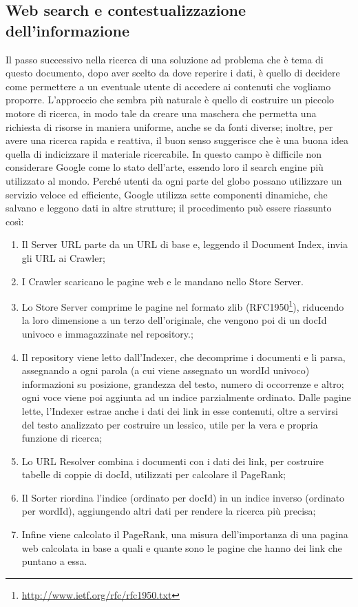 \documentclass[sigproc-sp.tex]{subfiles}
\begin{document}
\subsection{Web search e contestualizzazione dell’informazione} 
Il passo successivo nella ricerca di una soluzione ad problema che è tema di questo documento, dopo aver scelto da dove reperire i dati, è quello di decidere come permettere a un eventuale utente di accedere ai contenuti che vogliamo proporre. L’approccio che sembra più naturale è quello di costruire un piccolo motore di ricerca, in modo tale da creare una maschera che permetta una richiesta di risorse in maniera uniforme, anche se da fonti diverse; inoltre, per avere una ricerca rapida e reattiva, il buon senso suggerisce che è una buona idea quella di indicizzare il materiale ricercabile.
In questo campo è difficile non considerare Google come lo stato dell’arte, essendo loro il search engine più utilizzato al mondo. Perché utenti da ogni parte del globo possano utilizzare un servizio veloce ed efficiente, Google utilizza sette componenti dinamiche, che salvano e leggono dati in altre strutture; il procedimento può essere riassunto così:
\begin{enumerate}
  \item Il Server URL parte da un URL di base e, leggendo il Document Index, invia gli URL ai Crawler;
  \item I Crawler scaricano le pagine web e le mandano nello Store Server.
  \item Lo Store Server comprime le pagine nel formato zlib (RFC1950\footnote{\url{http://www.ietf.org/rfc/rfc1950.txt}}), riducendo la loro dimensione a un terzo dell’originale, che vengono poi di un docId univoco e immagazzinate nel repository.;
  \item Il repository viene letto dall’Indexer, che decomprime i documenti e li parsa, assegnando a ogni parola (a cui viene assegnato un wordId univoco) informazioni su posizione, grandezza del testo, numero di occorrenze e altro; ogni voce viene poi aggiunta ad un indice parzialmente ordinato. Dalle pagine lette, l’Indexer estrae anche i dati dei link in esse contenuti, oltre a servirsi del testo analizzato per costruire un lessico, utile per la vera e propria funzione di ricerca;
  \item Lo URL Resolver combina i documenti con i dati dei link, per costruire tabelle di coppie di docId, utilizzati per calcolare il PageRank;
  \item Il Sorter riordina l’indice (ordinato per docId) in un indice inverso (ordinato per wordId), aggiungendo altri dati per rendere la ricerca più precisa;
  \item Infine viene calcolato il PageRank, una misura dell’importanza di una pagina web calcolata in base a quali e quante sono le pagine che hanno dei link che puntano a essa.
\end{enumerate}
\end{document}

